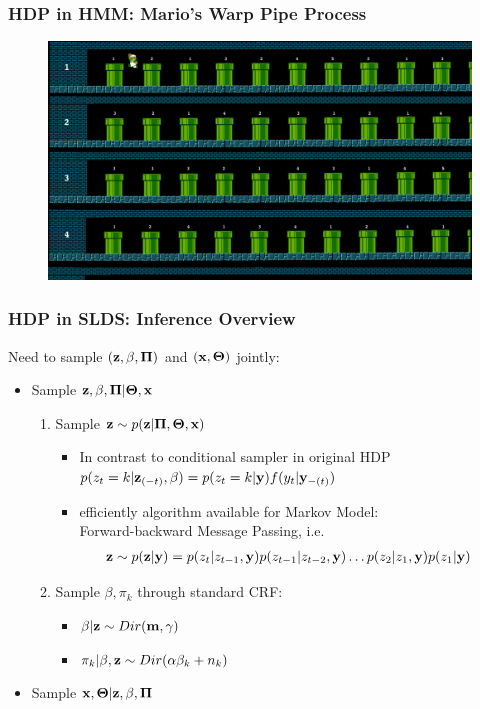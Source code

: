 \documentclass{beamer}
\begin{document}
\begin{frame}
\frametitle{HDP in HMM: Mario's Warp Pipe Process}
\begin{figure}
\includegraphics[width=1\linewidth]{"./plot/mario_pipe"}
\end{figure}
\end{frame}

\begin{frame}
\frametitle{HDP in SLDS: Inference Overview}
Need to sample $({\bf z}, \beta, \boldsymbol{\Pi})$ and $({\bf x}, \boldsymbol{\Theta})$ jointly:
\begin{itemize}
\item Sample ${\bf z}, \beta, \boldsymbol{\Pi} | \boldsymbol{\Theta}, {\bf x}$
\begin{enumerate}
\item Sample ${\bf z} \sim p({\bf z} | \boldsymbol{\Pi}, \boldsymbol{\Theta}, {\bf x})$
\begin{itemize}
\item In contrast to conditional sampler in original HDP \\
 $p(z_t = k| {\bf z}_{(-t)}, \beta) = p(z_t = k| {\bf y})f(y_t|{\bf y}_{-(t)})$
\item efficiently algorithm available for Markov Model:\\
Forward-backward Message Passing, i.e.
\begin{align*}
{\bf z} &\sim p({\bf z} | {\bf y}) 
= p(z_t | z_{t-1}, {\bf y})p(z_{t-1} | z_{t-2}, {\bf y}) \dots p(z_2 | z_1, {\bf y})p(z_1 | {\bf y})
\end{align*}
\end{itemize}
\item Sample $\beta, \pi_k$ through standard CRF:
\begin{itemize}
\item $\beta | {\bf z} \sim Dir({\bf m}, \gamma)$
\item $\pi_k | \beta, {\bf z} \sim Dir(\alpha \beta_k + n_k)$
\end{itemize}
\end{enumerate}
\item Sample ${\bf x}, \boldsymbol{\Theta} | {\bf z}, \beta, \boldsymbol{\Pi}$
\end{itemize}

\end{frame}
\end{document}
